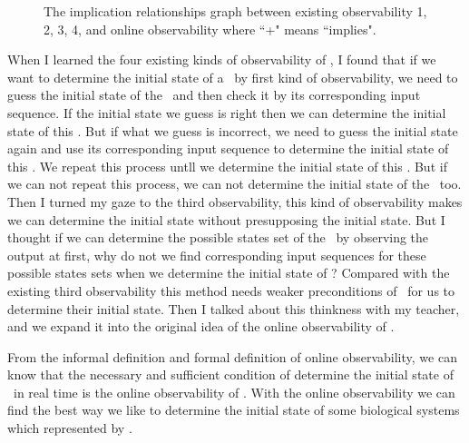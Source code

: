 \begin{figure}[thpb]
      \centering
      
      \caption{The implication relationships graph between existing observability 1, 2, 3, 4, and online observability where ``+" means ``implies".}
      \label{fig:7}
   \end{figure}
When I learned the four existing kinds of observability of \BCNs, I found that if we want to determine the initial state of a \BCN\ by first kind of observability, we need to guess the initial state of the \BCN\ and then check it by its corresponding input sequence. If the initial state we guess is right then we can determine the initial state of this \BCN. But if what we guess is incorrect, we need to guess the initial state again and use its corresponding input sequence to determine the initial state of this \BCN. We repeat this process untll we determine the initial state of this \BCN. But if we can not repeat this process, we can not determine the initial state of the \BCN\ too. Then I turned my gaze to the third observability, this kind of observability makes we can determine the initial state without presupposing the initial state. But I thought if we can determine the possible states set of the \BCN\ by observing the output at first, why do not we find corresponding input sequences for these possible states sets when we determine the initial state of \BCN? Compared with the existing third observability this method needs weaker preconditions of \BCNs\ for us to determine their initial state. Then I talked about this thinkness with my teacher, and we expand it into the original idea of the online observability of \BCNs. 

From the informal definition and formal definition of online observability, we can know that the necessary and sufficient condition of determine the initial state of \BCNs\ in real time is the online observability of \BCNs. With the online observability we can find the best way we like to determine the initial state of some biological systems which represented by \BCNs.
